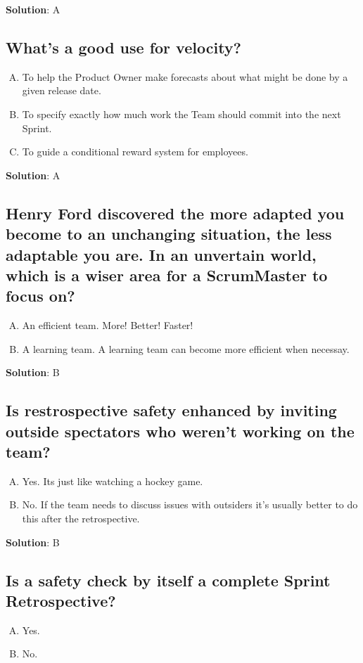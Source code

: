 \textbf{Solution}: A


\subsection{What's a good use for velocity?}
\begin{enumerate}[A)]
  \item To help the Product Owner make forecasts about what might be done by a given release date.
  \item To specify exactly how much work the Team should commit into the next Sprint.
  \item To guide a conditional reward system for employees.
\end{enumerate}


\textbf{Solution}: A


\subsection{Henry Ford discovered the more adapted you become to an unchanging situation,
  the less adaptable you are. In an unvertain world, which is a wiser area for a ScrumMaster to
  focus on?}


\begin{enumerate}[A)]
  \item An efficient team. More! Better! Faster!
  \item A learning team. A learning team can become more efficient when necessay.
\end{enumerate}


\textbf{Solution}: B


\subsection{Is restrospective safety enhanced by inviting outside spectators who weren't working on the team?}
\begin{enumerate}[A)]
  \item Yes. Its just like watching a hockey game.
  \item No. If the team needs to discuss issues with outsiders it's usually better to do
    this after the retrospective.
\end{enumerate}


\textbf{Solution}: B


\subsection{Is a safety check by itself a complete Sprint Retrospective?}
\begin{enumerate}[A)]
  \item Yes.
  \item No.
\end{enumerate}



